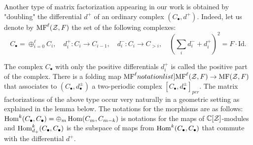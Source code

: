\documentclass[10pt]{amsart}
\begin{document}
Another type of matrix factorization appearing in our work is obtained by "doubling" the differential $d^+$ of an ordinary complex $(C_\bullet,d^+)$. Indeed, let us denote by $\mathrm{MF}^\ell(\mathcal{Z},F)$ the set of the following
complexes:
$$
C_\bullet=\oplus_{i=0}^\ell C_i,\quad
d^+_i: C_i\to C_{i-1},\quad
d^-_i:C_i\to C_{>i},\quad (\sum_i d_i^-+d_i^+)^2=F\cdot \mathrm{Id}.$$


\def\xHom{ \Hom }
\def\xExt{ \Hom }
\def\xExtdp{ \xExt_{d_+}}
\def\xExtdpv#1{ \xExtdp^{#1}}
\def\xExtdpk{ \xExtdpv{k}}
The complex $C_\bullet$ with only  the positive differentials $d^+_i$ is called the positive part of the complex.
There is a folding map $\SymbolPrint{\MFs^{\ell}}(\calZ,F)\to \MFs(\calZ,F)$ that associates to $(C_\bullet,d^\pm_\bullet)$ a two-periodic complex $[C_\bullet,d^\pm_\bullet]_{per}$.
The matrix factorizations of the above type occur very naturally in a geometric setting as explained in the lemma below. The notations for the morphisms are as follows:
$\xHom^{k}(C_\bullet,C_\bullet)=\oplus_{m} \yHom(C_m,C_{m-k})$ is notations for the maps of $\mathbb{C}[\mathcal{Z}]$-modules and
$\xExtdpk(C_\bullet,C_\bullet)$ is the subspace of maps from $\mathop{{\rm Hom}}\nolimits^k(C_\bullet,C_\bullet)$ that commute with the differential $d^+$.
\end{document}
